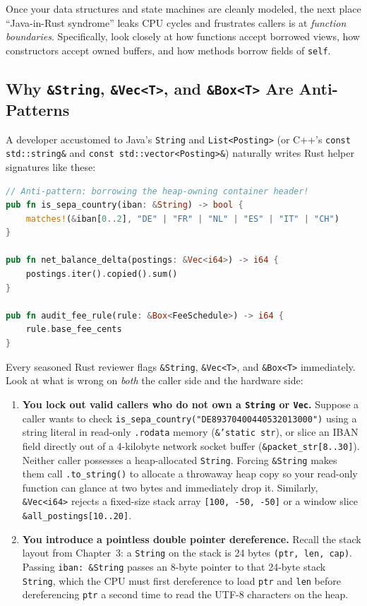 Once your data structures and state machines are cleanly modeled, the next place ``Java-in-Rust syndrome'' leaks CPU cycles and frustrates callers is at \emph{function boundaries}. Specifically, look closely at how functions accept borrowed views, how constructors accept owned buffers, and how methods borrow fields of \texttt{self}.

\subsection{Why \texttt{\&String}, \texttt{\&Vec<T>}, and \texttt{\&Box<T>} Are Anti-Patterns}

A developer accustomed to Java's \texttt{String} and \texttt{List<Posting>} (or C++'s \texttt{const std::string\&} and \texttt{const std::vector<Posting>\&}) naturally writes Rust helper signatures like these:

\begin{lstlisting}[language=Rust]
// Anti-pattern: borrowing the heap-owning container header!
pub fn is_sepa_country(iban: &String) -> bool {
    matches!(&iban[0..2], "DE" | "FR" | "NL" | "ES" | "IT" | "CH")
}

pub fn net_balance_delta(postings: &Vec<i64>) -> i64 {
    postings.iter().copied().sum()
}

pub fn audit_fee_rule(rule: &Box<FeeSchedule>) -> i64 {
    rule.base_fee_cents
}
\end{lstlisting}

Every seasoned Rust reviewer flags \texttt{\&String}, \texttt{\&Vec<T>}, and \texttt{\&Box<T>} immediately. Look at what is wrong on \emph{both} the caller side and the hardware side:

\begin{enumerate}
  \item \textbf{You lock out valid callers who do not own a \texttt{String} or \texttt{Vec}.} Suppose a caller wants to check \texttt{is\_sepa\_country(\allowbreak{}"DE89370400440532013000")} using a string literal in read-only \texttt{.rodata} memory (\texttt{\&'static str}), or slice an IBAN field directly out of a 4-kilobyte network socket buffer (\texttt{\&packet\_str[8..30]}). Neither caller possesses a heap-allocated \texttt{String}. Forcing \texttt{\&String} makes them call \texttt{.to\_string()} to allocate a throwaway heap copy so your read-only function can glance at two bytes and immediately drop it. Similarly, \texttt{\&Vec<i64>} rejects a fixed-size stack array \texttt{[100, -50, -50]} or a window slice \texttt{\&all\_postings[10..20]}.
  \item \textbf{You introduce a pointless double pointer dereference.} Recall the stack layout from Chapter~3: a \texttt{String} on the stack is 24 bytes \texttt{(ptr, len, cap)}. Passing \texttt{iban: \&String} passes an 8-byte pointer to that 24-byte stack \texttt{String}, which the CPU must first dereference to load \texttt{ptr} and \texttt{len} before dereferencing \texttt{ptr} a second time to read the UTF-8 characters on the heap.
\end{enumerate}

